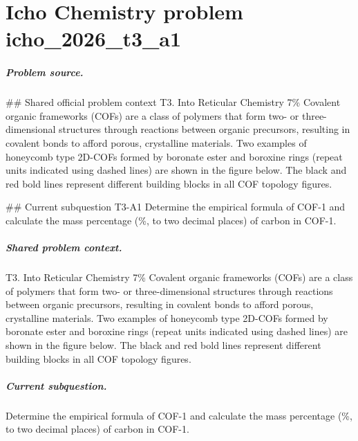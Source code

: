 
\chapter{Icho Chemistry problem icho\_2026\_t3\_a1}
\label{ch:IChO2026Problems_problem_icho_2026_t3_a1}

\paragraph{Problem source.}
\#\# Shared official problem context
T3. Into Reticular Chemistry 7\% Covalent organic frameworks (COFs) are a class of polymers that form two- or three-dimensional structures through reactions between organic precursors, resulting in covalent bonds to afford porous, crystalline materials. Two examples of honeycomb type 2D-COFs formed by boronate ester and boroxine rings (repeat units indicated using dashed lines) are shown in the figure below. The black and red bold lines represent different building blocks in all COF topology figures.

\#\# Current subquestion T3-A1
Determine the empirical formula of COF-1 and calculate the mass percentage (\%, to two decimal places) of carbon in COF-1.

\paragraph{Shared problem context.}
T3. Into Reticular Chemistry 7\% Covalent organic frameworks (COFs) are a class of polymers that form two- or three-dimensional structures through reactions between organic precursors, resulting in covalent bonds to afford porous, crystalline materials. Two examples of honeycomb type 2D-COFs formed by boronate ester and boroxine rings (repeat units indicated using dashed lines) are shown in the figure below. The black and red bold lines represent different building blocks in all COF topology figures.

\paragraph{Current subquestion.}
Determine the empirical formula of COF-1 and calculate the mass percentage (\%, to two decimal places) of carbon in COF-1.

